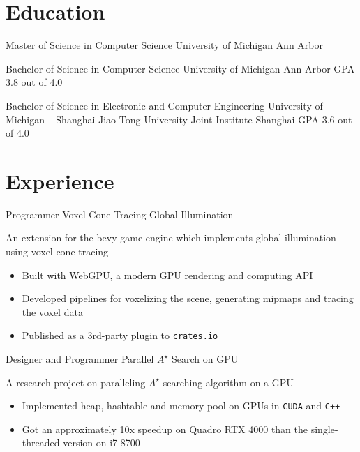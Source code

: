 \documentclass[10pt, a4paper, sans]{moderncv}
\title{}
\begin{document}
\makecvtitle

\section{Education}
{Master of Science in Computer Science}
{University of Michigan}
{Ann Arbor}
{}
{}

{Bachelor of Science in Computer Science}
{University of Michigan}
{Ann Arbor}
{GPA 3.8 out of 4.0}
{}

{Bachelor of Science in Electronic and Computer Engineering}
{University of Michigan -- Shanghai Jiao Tong University Joint Institute}
{Shanghai}
{GPA 3.6 out of 4.0}
{}

\section{Experience}
{Programmer}
{Voxel Cone Tracing Global Illumination}{}{}
{
	An extension for the bevy game engine which implements global illumination using voxel cone tracing
	\begin{itemize}
		\item Built with WebGPU, a modern GPU rendering and computing API
		\item Developed pipelines for voxelizing the scene, generating mipmaps and tracing the voxel data
		\item Published as a 3rd-party plugin to \texttt{crates.io}
	\end{itemize}
}

{Designer and Programmer}
{Parallel $A^\star$ Search on GPU}{}{}
{
	A research project on paralleling $A^\star$ searching algorithm on a GPU
	\begin{itemize}
		\item Implemented heap, hashtable and memory pool on GPUs in \texttt{CUDA} and \texttt{C++}
		\item Got an approximately 10x speedup on Quadro RTX 4000 than the single-threaded version on i7 8700
	\end{itemize}
}
\end{document}

